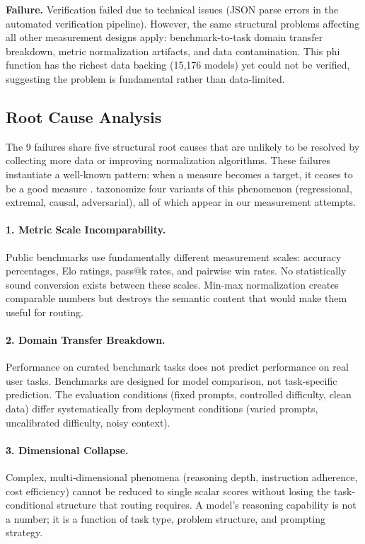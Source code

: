 \textbf{Failure.} Verification failed due to technical issues (JSON parse errors in the automated verification pipeline). However, the same structural problems affecting all other measurement designs apply: benchmark-to-task domain transfer breakdown, metric normalization artifacts, and data contamination. This phi function has the richest data backing (15,176 models) yet could not be verified, suggesting the problem is fundamental rather than data-limited.

\subsection{Root Cause Analysis}

The 9 failures share five structural root causes that are unlikely to be resolved by collecting more data or improving normalization algorithms. These failures instantiate a well-known pattern: when a measure becomes a target, it ceases to be a good measure \citep{goodhart1975monetary, campbell1979assessing}. \citet{manheim2019categorizing} taxonomize four variants of this phenomenon (regressional, extremal, causal, adversarial), all of which appear in our measurement attempts.

\paragraph{1. Metric Scale Incomparability.} Public benchmarks use fundamentally different measurement scales: accuracy percentages, Elo ratings, pass@k rates, and pairwise win rates. No statistically sound conversion exists between these scales. Min-max normalization creates comparable numbers but destroys the semantic content that would make them useful for routing.

\paragraph{2. Domain Transfer Breakdown.} Performance on curated benchmark tasks does not predict performance on real user tasks. Benchmarks are designed for model comparison, not task-specific prediction. The evaluation conditions (fixed prompts, controlled difficulty, clean data) differ systematically from deployment conditions (varied prompts, uncalibrated difficulty, noisy context).

\paragraph{3. Dimensional Collapse.} Complex, multi-dimensional phenomena (reasoning depth, instruction adherence, cost efficiency) cannot be reduced to single scalar scores without losing the task-conditional structure that routing requires. A model's reasoning capability is not a number; it is a function of task type, problem structure, and prompting strategy.


